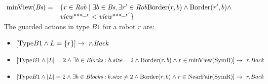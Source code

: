 $\begin{array}{l l}\!\text{minView}(\textit{Bs})=& 
\{r \in \textit{Rob} \mid \exists b \in \textit{Bs}, 
\exists r' \in \textit{Rob} 
 \textrm{Border}(r, b) \wedge \textrm{Border}(r', b) \wedge \\ &
 \mathit{view}^{\text{min}\_{r}}< \mathit{view}^{\text{min}\_{r'}}\} \\ \end{array}$\\
The guarded actions in type $B1$ for a robot $r$ are: 
\begin{itemize}%
\item
$[\text{Type}B1 \wedge L =\{r\}] \rightarrow\ r.\textit{Back}$
\item
  $[\text{Type}B1 \wedge |L| = 2 \wedge \exists b \in \textit{Blocks}: \\
b.\textit{size} = 2 
  \wedge \textrm{Border}(r, b) \wedge r \in
  \mathcal{\textrm{minView}}(\mathcal{\textrm{SymB}})]
\rightarrow \ r.\textit{Back}$
\item
$[\text{Type}B1 \wedge |L| = 2 \wedge
\exists b \in \textit{Blocks}: \\ b.\textit{size} \neq 2 
\wedge \textrm{Border}(r, b) \land r \in
\text{NearPair}(\textrm{SymR})]  \rightarrow \ r.\textit{Back}$ 
\end{itemize}


